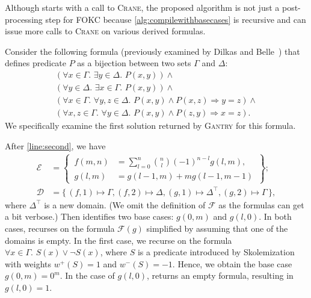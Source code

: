 \documentclass[a4paper,UKenglish,cleveref, autoref, thm-restate]{lipics-v2021}
\newcommand{\Cranetwo}{\textsc{Gantry}}
\begin{document}
\begin{remark*}
  Although \CompileWithBaseCases starts with a call to \textsc{Crane}, the
  proposed algorithm is not just a post-processing step for FOKC because
  \cref{alg:compilewithbasecases} is recursive and can issue more calls to
  \textsc{Crane} on various derived formulas.
\end{remark*}


\begin{example}\label{example:overall}
  Consider the following formula (previously examined by Dilkas and
  Belle~\cite{DBLP:conf/kr/DilkasB23}) that defines predicate $P$ as a bijection
  between two sets $\Gamma$ and $\Delta$:
  \[
    \begin{gathered}
      (\forall x \in \Gamma\text{. }\exists y \in \Delta\text{. }P(x, y))\land{}\\
      (\forall y \in \Delta\text{. }\exists x \in \Gamma\text{. }P(x, y))\land{}\\
      (\forall x \in \Gamma\text{. }\forall y, z \in \Delta\text{. }P(x, y) \land P(x, z) \Rightarrow y = z)\land{}\\
      (\forall x, z \in \Gamma\text{. }\forall y \in \Delta\text{. }P(x, y) \land P(z, y) \Rightarrow x = z).
    \end{gathered}
  \]
  We specifically examine the first solution returned by \Cranetwo{} for this
  formula.

  After \autoref{line:second}, we have
  \begin{align*}
    \mathcal{E} &= \left\{\,\begin{aligned}f(m, n) &= \sum_{l=0}^{n} \binom{n}{l}{(-1)}^{n-l}g(l, m),\\ g(l, m) &= g(l-1, m) + mg(l-1, m-1)\end{aligned}\,\right\};\\
    \mathcal{D} &= \{\, (f, 1) \mapsto \Gamma, (f, 2) \mapsto \Delta, (g, 1) \mapsto \Delta^{\top}, (g, 2) \mapsto \Gamma \,\},
  \end{align*}
  where $\Delta^{\top}$ is a new domain. (We omit the definition of
  $\mathcal{F}$ as the formulas can get a bit verbose.) Then \FindBaseCases
  identifies two base cases: $g(0, m)$ and $g(l, 0)$. In both cases,
  \CompileWithBaseCases recurses on the formula $\mathcal{F}(g)$ simplified by
  assuming that one of the domains is empty. In the first case, we recurse on
  the formula $\forall x \in \Gamma\text{. }S(x) \lor \neg S(x)$, where $S$ is a
  predicate introduced by Skolemization with weights $w^{+}(S) = 1$ and
  $w^{-}(S) = -1$. Hence, we obtain the base case $g(0, m) = 0^{m}$. In the case
  of $g(l, 0)$,  returns an empty formula,
  resulting in $g(l, 0) = 1$.
\end{example}
\end{document}
